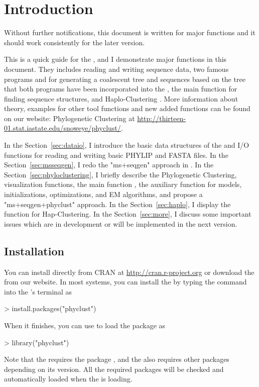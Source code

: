 
\section[Introduction]{Introduction}
\label{sec:introduction}

Without further notifications, this document is written for major
functions and it should work consistently for the later version. 

This is a quick guide for the , and I demonstrate
major functions in this document. They
includes reading and writing sequence data,
two famous programs  and 
\citep{Hudson2002, Rambaut1997} for generating
a coalescent tree and sequences based on the tree
that both programs have been
incorporated into the ,
the main function  for finding sequence structures,
and Haplo-Clustering \citep{tzeng2005}.
More information about theory, examples for other tool functions
and new added functions can be found on our website:
Phylogenetic Clustering at
\url{http://thirteen-01.stat.iastate.edu/snoweye/phyclust/}.

In the Section~\ref{sec:dataio}, I introduce the basic data structures
of the  and I/O functions for reading and writing basic
PHYLIP and FASTA files. In the Section~\ref{sec:msseqgen},
I redo the "ms+seqgen" approach in .
In the Section~\ref{sec:phyloclustering}, I briefly describe the
Phylogenetic Clustering, visualization functions,
 the main function , the auxiliary function
 for models, initializations, optimizations,
and EM algorithms, and propose a "ms+seqgen+phyclust" approach.
In the Section~\ref{sec:haplo}, I display the function
 for Hap-Clustering.
In the Section~\ref{sec:more}, I discuss some important issues
which are in development or will be implemented in the next version.




\subsection[Installation]{Installation}
\label{sec:installation}

You can install directly from CRAN at \url{http://cran.r-project.org} or
download the  from our website.
In most systems, you can install the  by typing the command
into the 's terminal as
\begin{Code}
> install.packages("phyclust")
\end{Code}
When it finishes, you can use  to load the package as
\begin{Code}
> library("phyclust")
\end{Code}
Note that the  requires the
 package \citep{Paradis2004}, and
the  also requires other packages depending on its version.
All the required packages will be checked and automatically loaded when
the  is loading.




